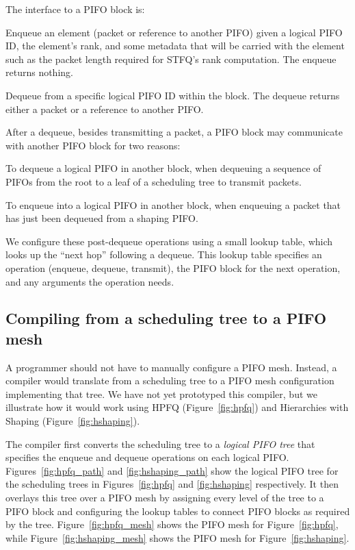 The interface to a PIFO block is:
\begin{CompactEnumerate}
\item Enqueue an element (packet or reference to another PIFO) given a
  logical PIFO ID, the element's rank, and some metadata that will be
  carried with the element such as the packet length required for
  STFQ's rank computation. The enqueue returns nothing.
\item Dequeue from a specific logical PIFO ID within the block. The dequeue
  returns either a packet or a reference to another PIFO.
\end{CompactEnumerate}

After a dequeue, besides transmitting a packet, a PIFO block may communicate
with another PIFO block for two reasons:
 \begin{CompactEnumerate}
 \item To dequeue a logical PIFO in another block, \eg when dequeuing a
   sequence of PIFOs from the root to a leaf of a scheduling tree to transmit
   packets.
 
 \item To enqueue into a logical PIFO in another block, \eg when
   enqueuing a packet that has just been dequeued from a shaping
   PIFO.
 \end{CompactEnumerate}

We configure these post-dequeue operations using a small lookup table, which
looks up the ``next hop'' following a dequeue. This lookup table specifies an
operation (enqueue, dequeue, transmit), the PIFO block for the next operation,
and any arguments the operation needs.

\subsection{Compiling from a scheduling tree to a PIFO mesh}
\label{pifo_ss:compiler}

A programmer should not have to manually configure a PIFO mesh. Instead, a
compiler would translate from a scheduling tree to a PIFO mesh configuration
implementing that tree.  We have not yet prototyped this compiler, but we
illustrate how it would work using HPFQ (Figure~\ref{fig:hpfq}) and Hierarchies
with Shaping (Figure~\ref{fig:hshaping}).

The compiler first converts the scheduling tree to a {\em logical PIFO tree}
that specifies the enqueue and dequeue operations on each logical PIFO.
Figures~\ref{fig:hpfq_path} and \ref{fig:hshaping_path} show the logical PIFO
tree for the scheduling trees in Figures~\ref{fig:hpfq} and \ref{fig:hshaping}
respectively.  It then overlays this tree over a PIFO mesh by assigning every
level of the tree to a PIFO block and configuring the lookup tables to connect
PIFO blocks as required by the tree.  Figure~\ref{fig:hpfq_mesh} shows the PIFO
mesh for Figure~\ref{fig:hpfq}, while Figure~\ref{fig:hshaping_mesh} shows the
PIFO mesh for Figure~\ref{fig:hshaping}.

